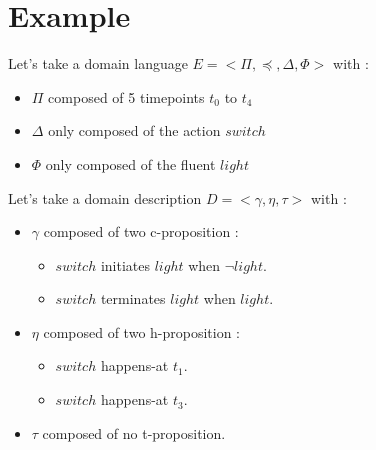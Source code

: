\section{Example}\label{sec:example}

Let's take a domain language $E=<\Pi,\preceq,\Delta,\Phi>$ with :
\begin{itemize}
  \item $\Pi$ composed of 5 timepoints $t_0$ to $t_4$
  \item $\Delta$ only composed of the action $switch$
  \item $\Phi$ only composed of the fluent $light$
\end{itemize}

Let's take a domain description $D=<\gamma,\eta,\tau>$ with :
\begin{itemize}
  \item $\gamma$ composed of two c-proposition :
  \begin{itemize}
    \item $switch$ initiates $light$ when $\neg light$.
    \item $switch$ terminates $light$ when $light$.
  \end{itemize}
  \item $\eta$ composed of two h-proposition :
  \begin{itemize}
    \item $switch$ happens-at $t_1$.
    \item $switch$ happens-at $t_3$.
  \end{itemize}
  \item $\tau$ composed of no t-proposition.
\end{itemize}

